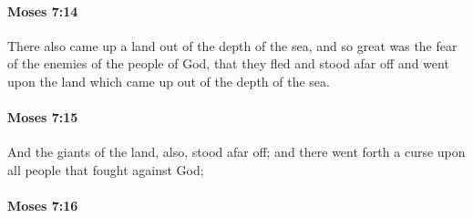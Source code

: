 
		\paragraph{Moses 7:14} %
			\label{MOSES-7-14}

			There also came up a land out of the depth of the sea, and so great was the fear of the enemies of the people of God, that they fled and stood afar off and went upon the land which came up out of the depth of the sea.


		\paragraph{Moses 7:15} %
			\label{MOSES-7-15}

			And the giants of the land, also, stood afar off; and there went forth a curse upon all people that fought against God;


		\paragraph{Moses 7:16} %
			\label{MOSES-7-16}

